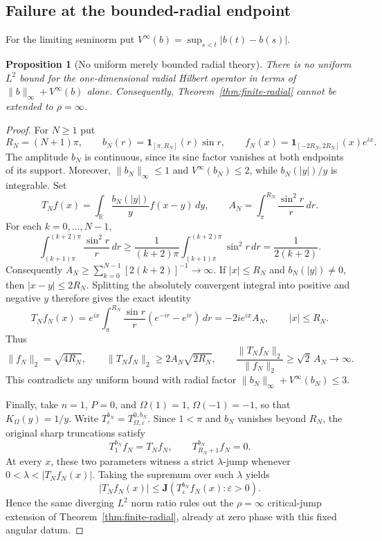 \documentclass[11pt]{article}
\numberwithin{equation}{section}
\newtheorem{proposition}[theorem]{Proposition}
\theoremstyle{remark}
\theoremstyle{definition}
\begin{document}
\subsection{Failure at the bounded-radial endpoint}

For the limiting seminorm put
$V^\infty(b)=\sup_{s<t}|b(t)-b(s)|$.

\begin{proposition}[No uniform merely bounded radial theory]
\label{prop:radial-infinity-counterexample}
There is no uniform $L^2$ bound for the one-dimensional radial Hilbert
operator in terms of $\|b\|_\infty+V^\infty(b)$ alone.  Consequently,
Theorem~\ref{thm:finite-radial} cannot be extended to $\rho=\infty$.
\end{proposition}

\begin{proof}
For $N\ge1$ put
\[
 R_N=(N+1)\pi,\qquad
 b_N(r)=\mathbf1_{[\pi,R_N]}(r)\sin r,\qquad
 f_N(x)=\mathbf1_{[-2R_N,2R_N]}(x)e^{ix}.
\]
The amplitude $b_N$ is continuous, since its sine factor vanishes at
both endpoints of its support.  Moreover,
$\|b_N\|_\infty\le1$ and $V^\infty(b_N)\le2$, while
$b_N(|y|)/y$ is integrable.  Set
\[
 T_Nf(x)=\int_{\mathbb R}\frac{b_N(|y|)}y f(x-y)\,dy,
 \qquad A_N=\int_\pi^{R_N}\frac{\sin^2r}{r}\,dr.
\]
For each $k=0,\ldots,N-1$,
\[
 \int_{(k+1)\pi}^{(k+2)\pi}\frac{\sin^2r}{r}\,dr
 \ge\frac1{(k+2)\pi}
       \int_{(k+1)\pi}^{(k+2)\pi}\sin^2r\,dr
 =\frac1{2(k+2)}.
\]
Consequently $A_N\ge\sum_{k=0}^{N-1}[2(k+2)]^{-1}\to\infty$.
If $|x|\le R_N$ and $b_N(|y|)\ne0$, then
$|x-y|\le2R_N$.  Splitting the absolutely convergent integral into
positive and negative $y$ therefore gives the exact identity
\[
 T_Nf_N(x)
 =e^{ix}\int_\pi^{R_N}\frac{\sin r}{r}
       (e^{-ir}-e^{ir})\,dr
 =-2i e^{ix}A_N,\qquad |x|\le R_N.
\]
Thus
\[
 \|f_N\|_2=\sqrt{4R_N},\qquad
 \|T_Nf_N\|_2\ge2A_N\sqrt{2R_N},\qquad
 \frac{\|T_Nf_N\|_2}{\|f_N\|_2}\ge\sqrt2\,A_N\longrightarrow\infty.
\]
This contradicts any uniform bound with radial factor
$\|b_N\|_\infty+V^\infty(b_N)\le3$.

Finally, take $n=1$, $P=0$, and $\Omega(1)=1$, $\Omega(-1)=-1$,
so that $K_\Omega(y)=1/y$.  Write
$T^{b_N}_\varepsilon=T^{0,b_N}_{\Omega,\varepsilon}$.
Since $1<\pi$ and $b_N$ vanishes beyond $R_N$, the original sharp
truncations satisfy
\[
 T^{b_N}_1f_N=T_Nf_N,\qquad T^{b_N}_{R_N+1}f_N=0.
\]
At every $x$, these two parameters witness a strict $\lambda$-jump
whenever $0<\lambda<|T_Nf_N(x)|$.  Taking the supremum over such
$\lambda$ yields
\[
 |T_Nf_N(x)|\le
 \mathbf J(T^{b_N}_\varepsilon f_N(x):\varepsilon>0).
\]
Hence the same diverging $L^2$ norm ratio rules out the
$\rho=\infty$ critical-jump extension of
Theorem~\ref{thm:finite-radial}, already at zero phase with this fixed
angular datum.
\end{proof}
\end{document}
